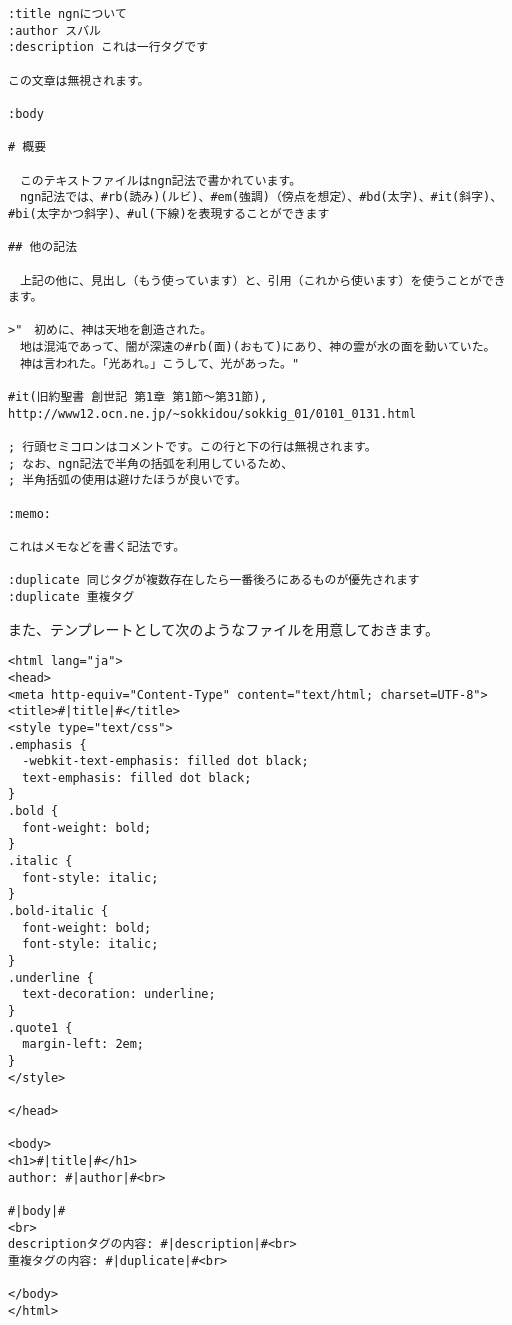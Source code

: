 \documentclass[a4j]{jsarticle}
\begin{document}
\begin{lstlisting}[caption=sample.txt]
:title ngnについて
:author スバル
:description これは一行タグです

この文章は無視されます。

:body

# 概要

　このテキストファイルはngn記法で書かれています。
　ngn記法では、#rb(読み)(ルビ)、#em(強調)（傍点を想定）、#bd(太字)、#it(斜字)、#bi(太字かつ斜字)、#ul(下線)を表現することができます

## 他の記法

　上記の他に、見出し（もう使っています）と、引用（これから使います）を使うことができます。

>"　初めに、神は天地を創造された。
　地は混沌であって、闇が深遠の#rb(面)(おもて)にあり、神の霊が水の面を動いていた。
　神は言われた。「光あれ。」こうして、光があった。"

#it(旧約聖書 創世記 第1章 第1節〜第31節),
http://www12.ocn.ne.jp/~sokkidou/sokkig_01/0101_0131.html

; 行頭セミコロンはコメントです。この行と下の行は無視されます。
; なお、ngn記法で半角の括弧を利用しているため、
; 半角括弧の使用は避けたほうが良いです。

:memo:

これはメモなどを書く記法です。

:duplicate 同じタグが複数存在したら一番後ろにあるものが優先されます
:duplicate 重複タグ

\end{lstlisting}

また、テンプレートとして次のようなファイルを用意しておきます。

\begin{lstlisting}[caption=template.html]
<html lang="ja">
<head>
<meta http-equiv="Content-Type" content="text/html; charset=UTF-8">
<title>#|title|#</title>
<style type="text/css">
.emphasis {
  -webkit-text-emphasis: filled dot black;
  text-emphasis: filled dot black;
}
.bold {
  font-weight: bold;
}
.italic {
  font-style: italic;
}
.bold-italic {
  font-weight: bold;
  font-style: italic;
}
.underline {
  text-decoration: underline;
}
.quote1 {
  margin-left: 2em;
}
</style>

</head>

<body>
<h1>#|title|#</h1>
author: #|author|#<br>

#|body|#
<br>
descriptionタグの内容: #|description|#<br>
重複タグの内容: #|duplicate|#<br>

</body>
</html>
\end{lstlisting}
\end{document}

